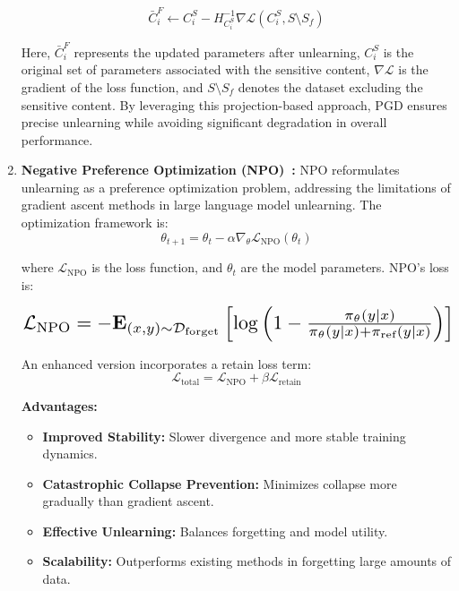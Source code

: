 \documentclass[11pt]{article}
\begin{document}
\begin{enumerate}
\begin{equation}
    \bar{C}_i^F \leftarrow C_i^S - H_{C_i^S}^{-1} \nabla \mathcal{L}(C_i^S, S \setminus S_f)
\end{equation}

Here, \( \bar{C}_i^F \) represents the updated parameters after unlearning, \( C_i^S \) is the original set of parameters associated with the sensitive content, \( \nabla \mathcal{L} \) is the gradient of the loss function, and \( S \setminus S_f \) denotes the dataset excluding the sensitive content. By leveraging this projection-based approach, PGD ensures precise unlearning while avoiding significant degradation in overall performance.

\item \textbf{Negative Preference Optimization (NPO)~\cite{zhang2024negative}:}  
NPO reformulates unlearning as a preference optimization problem, addressing the limitations of gradient ascent methods in large language model unlearning. The optimization framework is:
\vspace{-3pt}
\[
\theta_{t+1} = \theta_t - \alpha \nabla_{\theta} \mathcal{L}_{\text{NPO}}(\theta_t)
\]

where $\mathcal{L}_{\text{NPO}}$ is the loss function, and $\theta_t$ are the model parameters. NPO's loss is:

\[
\resizebox{\columnwidth}{!}{$\mathcal{L}_{\text{NPO}} = -\mathbf{E}_{(x,y) \sim \mathcal{D}_{\text{forget}}} \left[ \log \left(1 - \frac{\pi_\theta(y|x)}{\pi_\theta(y|x) + \pi_{\text{ref}}(y|x)} \right) \right]$}
\]


An enhanced version incorporates a retain loss term:
\vspace{-3pt}
\[
\mathcal{L}_{\text{total}} = \mathcal{L}_{\text{NPO}} + \beta \mathcal{L}_{\text{retain}}
\]

\textbf{Advantages:}
\begin{itemize}
    \item \textbf{Improved Stability:} Slower divergence and more stable training dynamics.  
    \item \textbf{Catastrophic Collapse Prevention:} Minimizes collapse more gradually than gradient ascent.  
    \item \textbf{Effective Unlearning:} Balances forgetting and model utility.  
    \item \textbf{Scalability:} Outperforms existing methods in forgetting large amounts of data.  
\end{itemize}


\end{enumerate}
\end{document}
